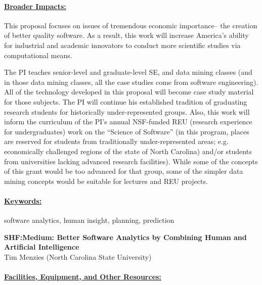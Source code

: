 \documentclass[11pt,letterpaper]{article}
\newcommand\myTitle{\newpage
\begin{center}
{\bf SHF:Medium: Better Software Analytics by Combining Human and Artificial Intelligence}\\
Tim Menzies (North Carolina State University)
\end{center}}
\newcommand\head[1]{\paragraph{\underline{#1}}}
\begin{document}
\head{Broader Impacts:}
This proposal focuses on issues of
tremendous economic importance--  the creation of better quality software.
As a result, this work will increase America's ability for industrial and academic innovators to conduct
more scientific studies via computational means.  
 

 The PI teaches senior-level and graduate-level SE, and data mining classes (and in those data mining classes, all the case studies come from software engineering).  All of the technology developed in this proposal will become case study material for those subjects.   The PI will continue his established tradition of graduating  research  students  for  historically  under-represented  groups.   Also, this work will inform the curriculum of the PI's annual
   NSF-funded REU (research experience for undergraduates) work on  the ``Science of Software''
   (in  this program, places are reserved for students from traditionally under-represented areas; e.g.  economically challenged regions of the state of North Carolina) and/or students from universities lacking advanced research facilities). While some of the concepts of this grant would be too advanced for that group, some of the simpler data mining concepts would be suitable for lectures and REU projects.


\head{Keywords:} software analytics,  human insight, planning, prediction
\newpage
\pagestyle{plain}

\setcounter{page}{1}
\renewcommand{\thepage} {D--\arabic{page}}
\myTitle



\newpage
\head{Facilities, Equipment, and Other Resources:}


\newpage


\end{document}
